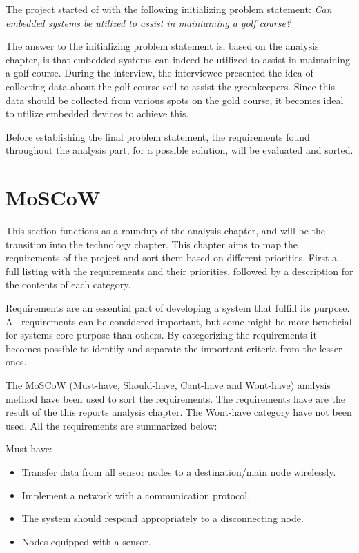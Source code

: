 The project started of with the following initializing problem statement:
\textit{Can embedded systems be utilized to assist in maintaining a golf course?}

The answer to the initializing problem statement is, based on the analysis chapter, is that embedded systems can indeed be utilized to assist in maintaining a golf course. During the interview, the interviewee presented the idea of collecting data about the golf course soil to assist the greenkeepers. Since this data should be collected from various spots on the gold course, it becomes ideal to utilize embedded devices to achieve this.

Before establishing the final problem statement, the requirements found throughout the analysis part, for a possible solution, will be evaluated and sorted.

\section{MoSCoW}
This section functions as a roundup of the analysis chapter, and will be the transition into the technology chapter. This chapter aims to map the requirements of the project and sort them based on different priorities. First a full listing with the requirements and their priorities, followed by a description for the contents of each category.

Requirements are an essential part of developing a system that fulfill its purpose. All requirements can be considered important, but some might be more beneficial for systems core purpose than others. By categorizing the requirements it becomes possible to identify and separate the important criteria from the lesser ones. 

The MoSCoW (Must-have, Should-have, Cant-have and Wont-have) analysis method have been used to sort the requirements. The requirements have are the result of the this reports analysis chapter. The Wont-have category have not been used. All the requirements are summarized below:


Must have:
\begin{itemize}
\item Transfer data from all sensor nodes to a destination/main node wirelessly.
\item Implement a network with a communication protocol.
\item The system should respond appropriately to a disconnecting node.
\item Nodes equipped with a sensor.
\end{itemize}


